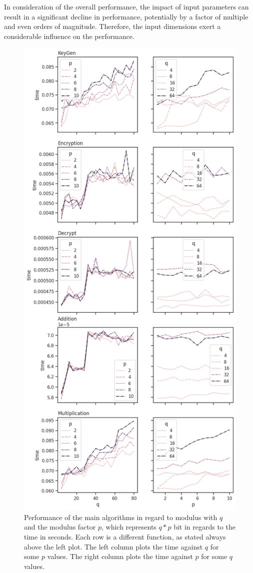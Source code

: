 In consideration of the overall performance, the impact of input parameters can result in a significant decline in performance, potentially by a factor of multiple and even orders of magnitude. Therefore, the input dimensions exert a considerable influence on the performance.

\begin{figure}[ht!]
  \centering
  \includegraphics[scale=0.48]{images/qp-performance.png}
  \caption[Performance of the HE algorithms by $q$ and $p$]{Performance of the main algorithms in regard to modulus with $q$ and the modulus factor $p$, which represents $q*p$ bit in regards to the time in seconds. Each row is a different function, as stated always above the left plot. The left column plots the time against $q$ for some $p$ values. The right column plots the time against $p$ for some $q$ values.}
  \label{fig:qp-performance}
\end{figure}

